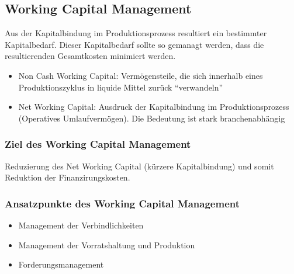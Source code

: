 \subsection{Working Capital Management}
Aus der Kapitalbindung im Produktionsprozess resultiert ein bestimmter Kapitalbedarf. Dieser Kapitalbedarf sollte so gemanagt werden, dass die resultierenden Gesamtkosten minimiert werden.
\begin{itemize}
	\item Non Cash Working Capital: Vermögensteile, die sich innerhalb eines Produktionszyklus in liquide Mittel zurück "`verwandeln"'
	\item Net Working Capital: Ausdruck der Kapitalbindung im Produktionsprozess (Operatives Umlaufvermögen). Die Bedeutung ist stark branchenabhängig
\end{itemize}

\subsubsection{Ziel des Working Capital Management}
Reduzierung des Net Working Capital (kürzere Kapitalbindung) und somit Reduktion der Finanzirungskosten.

\subsubsection{Ansatzpunkte des Working Capital Management}
\begin{itemize}
	\item Management der Verbindlichkeiten
	\item Management der Vorratshaltung und Produktion
	\item Forderungsmanagement
\end{itemize}


